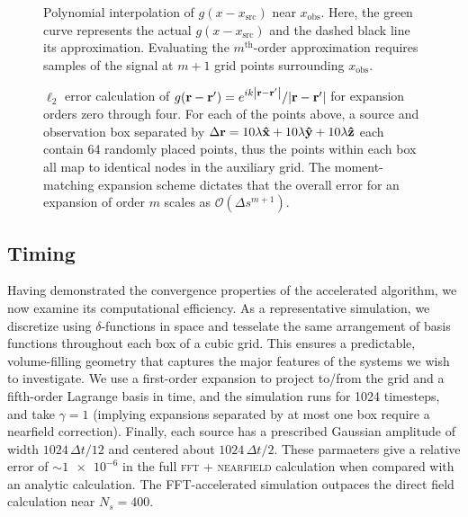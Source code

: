 \begin{figure}
  \centering
  \caption{\label{fig:1d moments} Polynomial interpolation of $g(x - x_\text{src})$ near $x_\text{obs}$.
    Here, the green curve represents the actual $g(x - x_\text{src})$ and the dashed black line its approximation.
    Evaluating the $m^\text{th}$-order approximation requires samples of the signal at $m + 1$ grid points surrounding $x_\text{obs}$.
  }
\end{figure}

\begin{figure}
  \centering
  \caption{\label{fig:grid convergence} $\ell_2$ error calculation of $g(\vb{r} - \vb{r}') = e^{i k \abs{\vb{r} - \vb{r}'}}/{\abs{\vb{r} - \vb{r}'}}$ for expansion orders zero through four.
    For each of the points above, a source and observation box separated by $\Delta \vb{r} = 10\lambda \vu{x} + 10 \lambda \vu{y} + 10 \lambda \vu{z}$ each contain 64 randomly placed points, thus the points within each box all map to identical nodes in the auxiliary grid.
    The moment-matching expansion scheme dictates that the overall error for an expansion of order $m$ scales as $\mathcal{O}(\Delta s^{m + 1})$.
  }
\end{figure}

\subsection{Timing}

Having demonstrated the convergence properties of the accelerated algorithm, we now examine its computational efficiency.
As a representative simulation, we discretize using $\delta$-functions in space and tesselate the same arrangement of basis functions throughout each box of a cubic grid.
This ensures a predictable, volume-filling geometry that captures the major features of the \qd{} systems we wish to investigate.
We use a first-order expansion to project to/from the grid and a fifth-order Lagrange basis in time, and the simulation runs for 1024 timesteps, and take $\gamma = 1$ (implying expansions separated by at most one box require a nearfield correction).
Finally, each source has a prescribed Gaussian amplitude of width $1024 \, \Delta t/12$ and centered about $1024 \, \Delta t/2$.
These parmaeters give a relative error of $\sim \num{1e-6}$ in the full \textsc{fft + nearfield} calculation when compared with an analytic calculation.
The FFT-accelerated simulation outpaces the direct field calculation near $N_s = \num{400}$.


